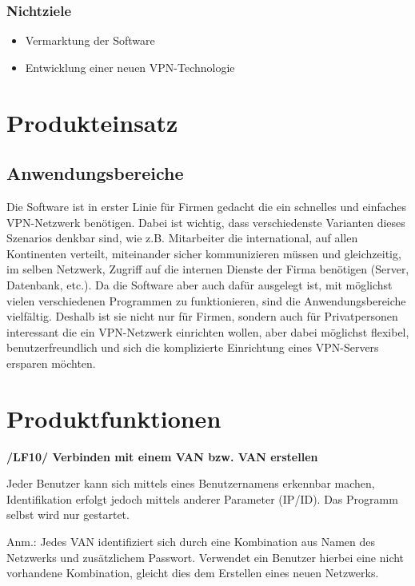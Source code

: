 \documentclass[a4paper,12pt]{scrreprt}
\begin{document}
	\subsection{Nichtziele}
	
	\begin{itemize}
	\item Vermarktung der Software
	\item Entwicklung einer neuen VPN-Technologie
	\end{itemize}
	
	
\chapter{Produkteinsatz}
	
	\section{Anwendungsbereiche}
	 Die Software ist in erster Linie für Firmen gedacht die ein schnelles und einfaches VPN-Netzwerk benötigen. Dabei ist wichtig, dass verschiedenste Varianten dieses Szenarios denkbar sind, wie z.B. Mitarbeiter die international, auf allen Kontinenten verteilt, miteinander sicher kommunizieren müssen und gleichzeitig, im selben Netzwerk, Zugriff auf die internen Dienste der Firma benötigen (Server, Datenbank, etc.). Da die Software aber auch dafür ausgelegt ist, mit möglichst vielen verschiedenen Programmen zu funktionieren, sind die Anwendungsbereiche vielfältig. Deshalb ist sie nicht nur für Firmen, sondern auch für Privatpersonen interessant die ein VPN-Netzwerk einrichten wollen, aber dabei möglichst flexibel, benutzerfreundlich und sich die komplizierte Einrichtung eines VPN-Servers ersparen möchten. 	
		
\chapter{Produktfunktionen}
	
	\textbf{/LF10/ Verbinden mit einem VAN bzw. VAN erstellen}
			
			Jeder Benutzer kann sich mittels eines Benutzernamens erkennbar machen, Identifikation erfolgt jedoch mittels anderer Parameter (IP/ID). Das Programm selbst wird nur gestartet.
			
			Anm.: Jedes VAN identifiziert sich durch eine Kombination aus Namen des Netzwerks und zusätzlichem Passwort. Verwendet ein Benutzer hierbei eine nicht vorhandene Kombination, gleicht dies dem Erstellen eines neuen Netzwerks. 
			
\end{document}
